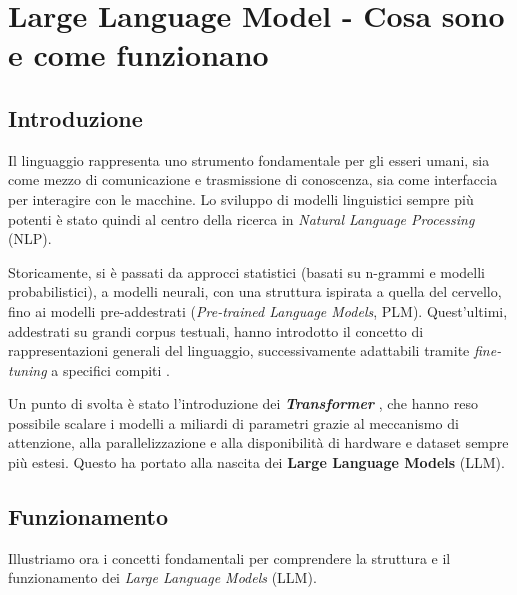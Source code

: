 ﻿\chapter{Large Language Model - Cosa sono e come funzionano}


\section{Introduzione}

Il linguaggio rappresenta uno strumento fondamentale per gli esseri umani, sia come mezzo di comunicazione e trasmissione di conoscenza,
sia come interfaccia per interagire con le macchine. Lo sviluppo di modelli linguistici sempre più potenti è stato quindi al centro
della ricerca in \textit{Natural Language Processing} (NLP).

Storicamente, si è passati da approcci statistici (basati su n-grammi e modelli probabilistici), a modelli neurali, con una struttura ispirata
a quella del cervello, fino ai modelli pre-addestrati (\textit{Pre-trained Language Models}, PLM).
Quest'ultimi, addestrati su grandi corpus testuali, hanno introdotto il concetto di rappresentazioni generali del linguaggio,
successivamente adattabili tramite \textit{fine-tuning} a specifici compiti \cite{devlin2019bert}\cite{peters2018elmo}\cite{lewis2019bart}.

Un punto di svolta è stato l'introduzione dei \textbf{\textit{Transformer}} \cite{chernyavskiy2021transformers},
che hanno reso possibile scalare i modelli a miliardi di parametri grazie al meccanismo di attenzione,
alla parallelizzazione e alla disponibilità di hardware e dataset sempre più estesi.
Questo ha portato alla nascita dei \textbf{Large Language Models} (LLM).

\newpage
\section{Funzionamento}

Illustriamo ora i concetti fondamentali per comprendere
la struttura e il funzionamento dei \textit{Large Language Models} (LLM).

